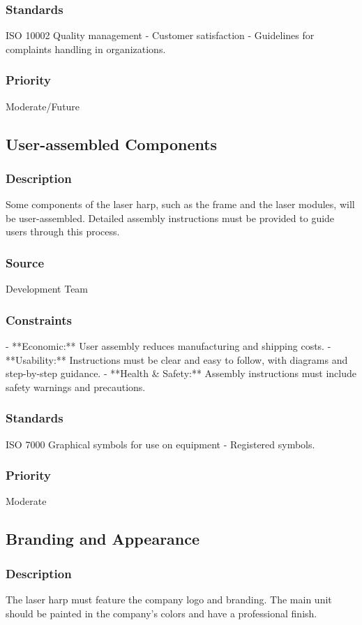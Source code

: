 \subsubsection{Standards}
ISO 10002 Quality management - Customer satisfaction - Guidelines for complaints handling in organizations.
\subsubsection{Priority}
Moderate/Future


\subsection{User-assembled Components}
\subsubsection{Description}
Some components of the laser harp, such as the frame and the laser modules, will be user-assembled. Detailed assembly instructions must be provided to guide users through this process.
\subsubsection{Source}
Development Team
\subsubsection{Constraints}
- **Economic:** User assembly reduces manufacturing and shipping costs.
- **Usability:** Instructions must be clear and easy to follow, with diagrams and step-by-step guidance.
- **Health & Safety:** Assembly instructions must include safety warnings and precautions.
\subsubsection{Standards}
ISO 7000 Graphical symbols for use on equipment - Registered symbols.
\subsubsection{Priority}
Moderate


\subsection{Branding and Appearance}
\subsubsection{Description}
The laser harp must feature the company logo and branding. The main unit should be painted in the company’s colors and have a professional finish.

